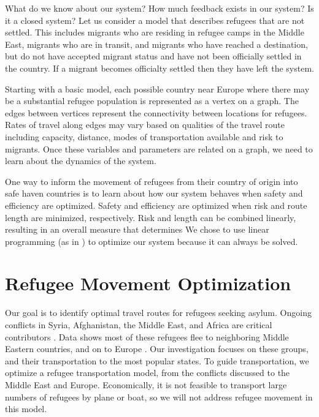\documentclass{article}
\begin{document}
\begin{enumerate}
    What do we know about our system?
    How much feedback exists in our system? Is it a closed system? 
    Let us consider a model that describes refugees that are not settled. This includes migrants who are residing in refugee camps in the Middle East, migrants who are in transit, and migrants who have reached a destination, but do not have accepted migrant status and have not been officially settled in the country. If a migrant becomes officialty settled then they have left the system. 

    Starting with a basic model, each possible country near Europe where there may be a substantial refugee population is represented as a vertex on a graph. The edges between vertices represent the connectivity between locations for refugees. Rates of travel along edges may vary based on qualities of the travel route including capacity, distance, modes of transportation available and risk to migrants. Once these variables and parameters are related on a graph, we need to learn about the dynamics of the system.

    One way to inform the movement of refugees from their country of origin into safe haven countries is to learn about how our system behaves when safety and efficiency are optimized. Safety and efficiency are optimized when risk and route length are minimized, respectively. Risk and length can be combined linearly, resulting in an overall measure that determines We chose to use linear programming (as in \cite{bertsekas}) to optimize our system because it can always be solved.

\section{Refugee Movement Optimization}

Our goal is to identify optimal travel routes for refugees seeking asylum. Ongoing conflicts in Syria, Afghanistan, the Middle East, and Africa are critical contributors \cite{refugeefactsheet}. Data shows most of these refugees flee to neighboring Middle Eastern countries, and on to Europe \cite{refugeefactsheet}. Our investigation focuses on these groups, and their transportation to the most popular states. To guide transportation, we optimize a refugee transportation model, from the conflicts discussed to the Middle East and Europe. Economically, it is not feasible to transport large numbers of refugees by plane or boat, so we will not address refugee movement in this model.


\end{enumerate}
\end{document}
